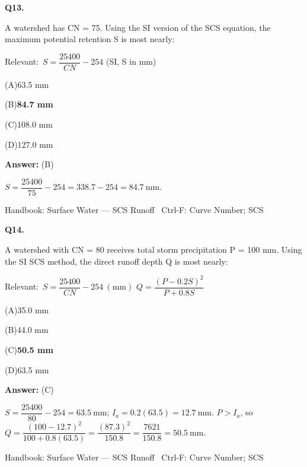 \documentclass[11pt]{article}
\newcommand{\correct}[1]{\textbf{#1}\;{\color{accent}$\checkmark$}}
\newcommand{\optline}[2]{\par\noindent\hspace{1.2em}(#1)\hspace{0.6em}#2}
\begin{document}
\vspace{9pt}
\filbreak
\textbf{\color{accent}Q13.}\par\vspace{2pt}
A watershed has CN = 75. Using the SI version of the SCS equation, the maximum potential retention S is most nearly:\par\vspace{3pt}
{\small\color{soft}Relevant:}\ $S = \dfrac{25400}{CN} - 254$ (SI, S in mm)\par\vspace{3pt}
\optline{A}{63.5 mm}
\optline{B}{\correct{84.7 mm}}
\optline{C}{108.0 mm}
\optline{D}{127.0 mm}
\par\vspace{3pt}
\vspace{2pt}\par\noindent\colorbox{boxbg}{\parbox{\dimexpr\linewidth-2\fboxsep\relax}{%
\vspace{2pt}\textbf{Answer:} (B)\par\vspace{2pt}
{\small $S = \dfrac{25400}{75} - 254 = 338.7 - 254 = 84.7\ \mathrm{mm}$.}\par\vspace{2pt}
{\footnotesize\color{soft}Handbook: Surface Water --- SCS Runoff \textbullet\ Ctrl-F: Curve Number; SCS}\vspace{2pt}
}}
\vspace{9pt}
\filbreak
\textbf{\color{accent}Q14.}\par\vspace{2pt}
A watershed with CN = 80 receives total storm precipitation P = 100 mm. Using the SI SCS method, the direct runoff depth Q is most nearly:\par\vspace{3pt}
{\small\color{soft}Relevant:}\ $S = \dfrac{25400}{CN} - 254\ (\mathrm{mm})$ \quad $Q = \dfrac{(P - 0.2S)^{2}}{P + 0.8S}$\par\vspace{3pt}
\optline{A}{35.0 mm}
\optline{B}{44.0 mm}
\optline{C}{\correct{50.5 mm}}
\optline{D}{63.5 mm}
\par\vspace{3pt}
\vspace{2pt}\par\noindent\colorbox{boxbg}{\parbox{\dimexpr\linewidth-2\fboxsep\relax}{%
\vspace{2pt}\textbf{Answer:} (C)\par\vspace{2pt}
{\small $S = \dfrac{25400}{80} - 254 = 63.5\ \mathrm{mm}$; $I_a = 0.2(63.5) = 12.7\ \mathrm{mm}$. $P > I_a$, so $Q = \dfrac{(100 - 12.7)^{2}}{100 + 0.8(63.5)} = \dfrac{(87.3)^{2}}{150.8} = \dfrac{7621}{150.8} = 50.5\ \mathrm{mm}$.}\par\vspace{2pt}
{\footnotesize\color{soft}Handbook: Surface Water --- SCS Runoff \textbullet\ Ctrl-F: Curve Number; SCS}\vspace{2pt}
}}
\end{document}
